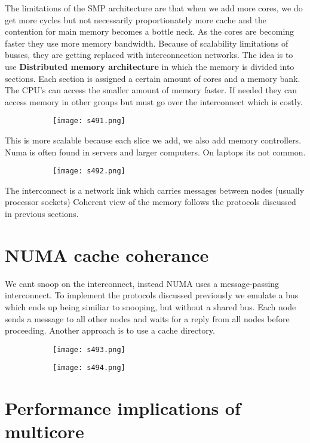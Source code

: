 \documentclass[8pt]{extreport}
\begin{document}
The limitations of the SMP architecture are that when we add more cores, we do get more cycles but not necessarily proportionately more cache and the contention for main memory becomes a bottle neck. As the cores are becoming faster they use more memory bandwidth. Because of scalability limitations of busses, they are getting replaced with interconnection networks. The idea is to use \textbf{Distributed memory architecture} in which the memory is divided into sections. Each section is assigned a certain amount of cores and a memory bank. The CPU's can access the smaller amount of memory faster. If needed they can access memory in other groups but must go over the interconnect which is costly.
 \begin{figure}[H]
\begin{subfigure}[b]{0.4\linewidth}
\texttt{[image: s491.png]}
\end{subfigure}
\end{figure}
This is more scalable because each slice we add, we also add memory controllers. Numa is often found in servers and larger computers. On laptops its not common.
 \begin{figure}[H]
\begin{subfigure}[b]{0.4\linewidth}
\texttt{[image: s492.png]}
\end{subfigure}
\end{figure}
The interconnect is a network link which carries messages between nodes (usually processor sockets)
Coherent view of the memory follows the protocols discussed in previous sections.
\section{NUMA cache coherance}
We cant snoop on the interconnect, instead NUMA uses a message-passing interconnect. To implement the protocols discussed previously we emulate a bus which ends up being similiar to snooping, but without a shared bus. Each node sends a message to all other nodes and waits for a reply from all nodes before proceeding. Another approach is to use a cache directory.
 \begin{figure}[H]
\begin{subfigure}[b]{0.4\linewidth}
\texttt{[image: s493.png]}
\end{subfigure}
\begin{subfigure}[b]{0.4\linewidth}
\texttt{[image: s494.png]}
\end{subfigure}
\end{figure}
\section{Performance implications of multicore} 
\end{document}
